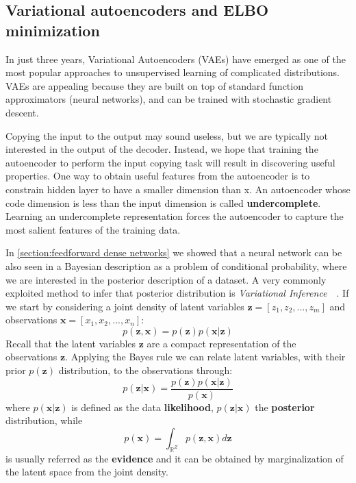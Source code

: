 \subsection{Variational autoencoders and ELBO minimization}
\label{section:VAE}
In just three years, Variational Autoencoders (VAEs) have emerged as one of the most popular approaches to unsupervised learning of complicated distributions. VAEs are appealing because they are built on top of standard function approximators (neural networks), and can be trained with stochastic gradient descent.

Copying the input to the output may sound useless, but we are typically not interested in the output of the decoder. Instead, we hope that training the autoencoder to perform the input copying task will result in discovering useful properties. One way to obtain useful features from the autoencoder is to constrain hidden layer to have a smaller dimension than x. An autoencoder whose code dimension is less than the input dimension is called \textbf{undercomplete}. Learning an undercomplete representation forces the autoencoder to capture the most salient features of the training data.


In \cref{section:feedforward dense networks} we showed that a neural network can be also seen in a Bayesian description as a problem of conditional probability, where we are interested in the posterior description of a dataset. A very commonly exploited method to infer that posterior distribution is \textit{Variational Inference}~\cite{Jordan:1999:IVM:339248.339252}~\cite{MAL-001}.
If we start by considering a joint density of latent variables $\bm{z} = [z_1, z_2, ...,z_m]$ and observations $\bm{x} = [x_1, x_2, ..., x_n]$:
\begin{equation}
    p(\bm{z},\bm{x}) = p(\bm{z}) p(\bm{x}|\bm{z})
\end{equation}
Recall that the latent variables $\bm{z}$ are a compact representation of the observations $\bm{z}$. Applying the Bayes rule we can relate latent variables, with their prior $p(\bm{z})$ distribution, to the observations through:
\begin{equation}
    p(\bm{z}|\bm{x}) = \frac{p(\bm{z})p(\bm{x}|\bm{z})}{p(\bm{x})}
\end{equation}
where $p(\bm{x}|\bm{z})$ is defined as the data \textbf{likelihood}, $p(\bm{z}|\bm{x})$ the \textbf{posterior} distribution, while
\begin{equation}
    p(\bm{x}) = \int_{\mathbb{R}^Z} p(\bm{z}, \bm{x}) d\bm{z}
\end{equation}
is usually referred as the \textbf{evidence} and it can be obtained by marginalization of the latent space from the joint density.


